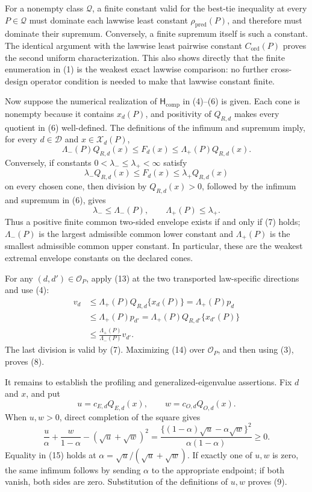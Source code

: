 For a nonempty class \(\mathcal Q\), a finite constant valid for the best-tie inequality at every \(P\in\mathcal Q\) must dominate each lawwise least constant \(\rho_{\mathrm{pred}}(P)\), and therefore must dominate their supremum.  Conversely, a finite supremum itself is such a constant.  The identical argument with the lawwise least pairwise constant \(C_{\mathrm{ord}}(P)\) proves the second uniform characterization.  This also shows directly that the finite enumeration in (1) is the weakest exact lawwise comparison: no further cross-design operator condition is needed to make that lawwise constant finite.

Now suppose the numerical realization of \(\mathsf H_{\mathrm{comp}}\) in (4)--(6) is given.  Each cone is nonempty because it contains \(x_d(P)\), and positivity of \(Q_{R,d}\) makes every quotient in (6) well-defined.  The definitions of the infimum and supremum imply, for every \(d\in\mathcal D\) and \(x\in\mathcal X_d(P)\),
\[
 \Lambda_-(P)Q_{R,d}(x)
 \le F_d(x)
 \le \Lambda_+(P)Q_{R,d}(x).                               \tag{13}
\]
Conversely, if constants \(0<\lambda_-\le\lambda_+<\infty\) satisfy
\[
 \lambda_-Q_{R,d}(x)\le F_d(x)\le\lambda_+Q_{R,d}(x)
\]
on every chosen cone, then division by \(Q_{R,d}(x)>0\), followed by the infimum and supremum in (6), gives
\[
 \lambda_-\le\Lambda_-(P),
 \qquad
 \Lambda_+(P)\le\lambda_+.
\]
Thus a positive finite common two-sided envelope exists if and only if (7) holds; \(\Lambda_-(P)\) is the largest admissible common lower constant and \(\Lambda_+(P)\) is the smallest admissible common upper constant.  In particular, these are the weakest extremal envelope constants on the declared cones.

For any \((d,d')\in\mathcal O_P\), apply (13) at the two transported law-specific directions and use (4):
\[
\begin{aligned}
 v_d
 &\le \Lambda_+(P)Q_{R,d}\{x_d(P)\}
   =\Lambda_+(P)p_d\\
 &\le \Lambda_+(P)p_{d'}
   =\Lambda_+(P)Q_{R,d'}\{x_{d'}(P)\}\\
 &\le \frac{\Lambda_+(P)}{\Lambda_-(P)}v_{d'}.
\end{aligned}                                               \tag{14}
\]
The last division is valid by (7).  Maximizing (14) over \(\mathcal O_P\), and then using (3), proves (8).

It remains to establish the profiling and generalized-eigenvalue assertions.  Fix \(d\) and \(x\), and put
\[
 u=c_{E,d}Q_{E,d}(x),
 \qquad w=c_{O,d}Q_{O,d}(x).
\]
When \(u,w>0\), direct completion of the square gives
\[
 \frac{u}{\alpha}+\frac{w}{1-\alpha}
 -(\sqrt u+\sqrt w)^2
 =\frac{\{(1-\alpha)\sqrt u-\alpha\sqrt w\}^2}
        {\alpha(1-\alpha)}
 \ge0.                                                       \tag{15}
\]
Equality in (15) holds at \(\alpha=\sqrt u/(\sqrt u+\sqrt w)\).  If exactly one of \(u,w\) is zero, the same infimum follows by sending \(\alpha\) to the appropriate endpoint; if both vanish, both sides are zero.  Substitution of the definitions of \(u,w\) proves (9).

